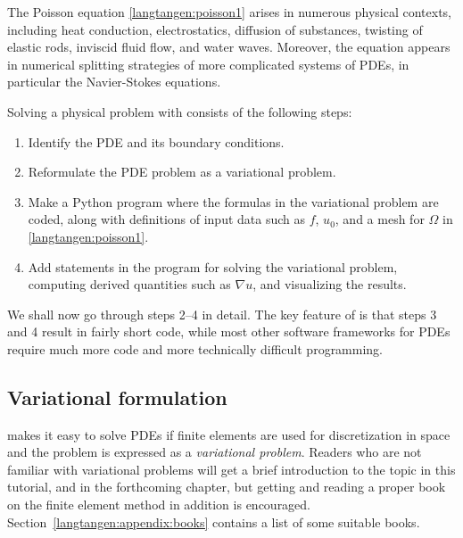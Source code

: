 The Poisson equation \eqref{langtangen:poisson1} arises in numerous physical
contexts, including heat conduction, electrostatics,
diffusion of substances, twisting of
elastic rods, inviscid fluid flow, and water waves. Moreover, the equation
appears in numerical splitting strategies of more complicated systems
of PDEs, in particular the Navier-Stokes equations. 


Solving a physical problem with \fenics{} consists
of the following steps:
\begin{enumerate}
\item Identify the PDE and its boundary conditions.
\item Reformulate the PDE problem as a variational problem.
\item Make a Python program where the formulas in the variational
problem are coded, along with definitions of input data such as
$f$, $u_0$, and a mesh for $\Omega$ in \eqref{langtangen:poisson1}.
\item Add statements in the program for solving the variational
problem, computing derived quantities such as $\nabla u$, and
visualizing the results.
\end{enumerate}
We shall now go through steps 2--4 in detail.
The key feature of \fenics{} is that steps 3 and 4 result in fairly
short code, while most other software frameworks for PDEs require
much more code and more technically difficult programming.

\subsection{Variational formulation}
\label{langtangen:poisson1:varform}

\fenics{} makes it easy to solve PDEs if finite elements are used for
discretization in space and the problem is expressed as a
\emph{variational problem}. Readers who are not familiar with
variational problems will get a brief introduction to the topic in
this tutorial, and in the forthcoming chapter, but getting and reading
a proper book on the finite element method in addition is encouraged.
Section~\ref{langtangen:appendix:books} contains a list of some suitable
books. 


